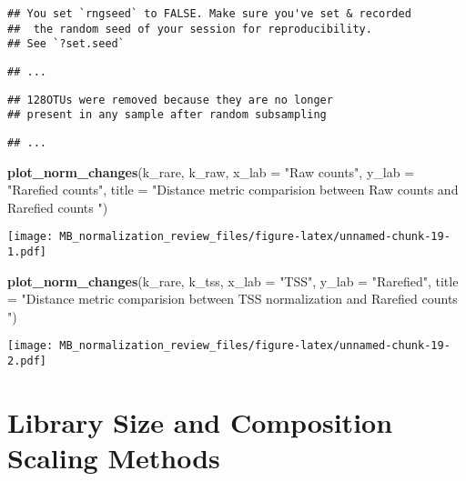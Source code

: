 \documentclass[
]{book}
\newenvironment{Shaded}{\begin{snugshade}}{\end{snugshade}}
\newcommand{\DataTypeTok}[1]{\textcolor[rgb]{0.13,0.29,0.53}{#1}}
\newcommand{\KeywordTok}[1]{\textcolor[rgb]{0.13,0.29,0.53}{\textbf{#1}}}
\newcommand{\NormalTok}[1]{#1}
\newcommand{\StringTok}[1]{\textcolor[rgb]{0.31,0.60,0.02}{#1}}
\begin{document}
\begin{verbatim}
## You set `rngseed` to FALSE. Make sure you've set & recorded
##  the random seed of your session for reproducibility.
## See `?set.seed`
\end{verbatim}

\begin{verbatim}
## ...
\end{verbatim}

\begin{verbatim}
## 128OTUs were removed because they are no longer 
## present in any sample after random subsampling
\end{verbatim}

\begin{verbatim}
## ...
\end{verbatim}

\begin{Shaded}
\begin{Highlighting}[]
\KeywordTok{plot\_norm\_changes}\NormalTok{(k\_rare, k\_raw,}
                  \DataTypeTok{x\_lab =} \StringTok{"Raw counts"}\NormalTok{, }\DataTypeTok{y\_lab =} \StringTok{"Rarefied counts"}\NormalTok{, }
                  \DataTypeTok{title =} \StringTok{"Distance metric comparision between Raw counts and Rarefied counts "}\NormalTok{)}
\end{Highlighting}
\end{Shaded}

\texttt{[image: MB\_normalization\_review\_files/figure-latex/unnamed-chunk-19-1.pdf]}

\begin{Shaded}
\begin{Highlighting}[]
\KeywordTok{plot\_norm\_changes}\NormalTok{(k\_rare, k\_tss,}
                  \DataTypeTok{x\_lab =} \StringTok{"TSS"}\NormalTok{, }\DataTypeTok{y\_lab =} \StringTok{"Rarefied"}\NormalTok{, }
                  \DataTypeTok{title =} \StringTok{"Distance metric comparision between TSS normalization and Rarefied counts "}\NormalTok{)}
\end{Highlighting}
\end{Shaded}

\texttt{[image: MB\_normalization\_review\_files/figure-latex/unnamed-chunk-19-2.pdf]}

\hypertarget{library-size-and-composition-scaling-methods}{%
\chapter{Library Size and Composition Scaling Methods}\label{library-size-and-composition-scaling-methods}}
\end{document}
